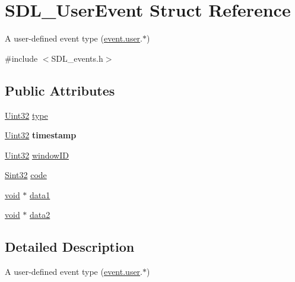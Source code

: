 \hypertarget{struct_s_d_l___user_event}{}\section{S\+D\+L\+\_\+\+User\+Event Struct Reference}
\label{struct_s_d_l___user_event}


A user-\/defined event type (\hyperlink{union_s_d_l___event_ab7c394e3ce7bf1e4f8d68bc0e9f1b042}{event.\+user}.$\ast$)  




{\ttfamily \#include $<$S\+D\+L\+\_\+events.\+h$>$}

\subsection*{Public Attributes}
\begin{DoxyCompactItemize}
\item 
\hyperlink{_s_d_l__stdinc_8h_add440eff171ea5f55cb00c4a9ab8672d}{Uint32} \hyperlink{struct_s_d_l___user_event_ab7afa8b98dbd7b52bef41155e10f7340}{type}
\item 
\hypertarget{struct_s_d_l___user_event_adbf1d34c73138a0c549310e5d4ad0c35}{}\hyperlink{_s_d_l__stdinc_8h_add440eff171ea5f55cb00c4a9ab8672d}{Uint32} {\bfseries timestamp}\label{struct_s_d_l___user_event_adbf1d34c73138a0c549310e5d4ad0c35}

\item 
\hyperlink{_s_d_l__stdinc_8h_add440eff171ea5f55cb00c4a9ab8672d}{Uint32} \hyperlink{struct_s_d_l___user_event_abccefa10e0e0e3a0801bc6d836a08da7}{window\+I\+D}
\item 
\hyperlink{_s_d_l__stdinc_8h_a7a90b941db9d4582e9ad7abb9940ff7e}{Sint32} \hyperlink{struct_s_d_l___user_event_aef47976781ee82b527a353c5acfa0a34}{code}
\item 
\hyperlink{_s_d_l__audio_8h_a52835ae37c4bb905b903cbaf5d04b05f}{void} $\ast$ \hyperlink{struct_s_d_l___user_event_ab2893a12be2f97195f16463a23107913}{data1}
\item 
\hyperlink{_s_d_l__audio_8h_a52835ae37c4bb905b903cbaf5d04b05f}{void} $\ast$ \hyperlink{struct_s_d_l___user_event_aae4dbf65c34d654c9edf519eb061b7cf}{data2}
\end{DoxyCompactItemize}


\subsection{Detailed Description}
A user-\/defined event type (\hyperlink{union_s_d_l___event_ab7c394e3ce7bf1e4f8d68bc0e9f1b042}{event.\+user}.$\ast$) 


